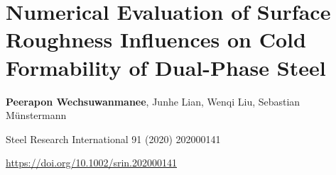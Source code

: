 \chapter[bending]{Numerical Evaluation of Surface Roughness Influences on Cold Formability of Dual-Phase Steel}\label{ch:bending}
\begin{center}

    \textbf{Peerapon Wechsuwanmanee}, Junhe Lian, Wenqi Liu, Sebastian Münstermann
    
    \vspace{20pt}
    
    Steel Research International 91 (2020) 202000141
    
    \vspace{20pt}
    
    \url{https://doi.org/10.1002/srin.202000141}
    
    \vspace{40pt}
    
\end{center}